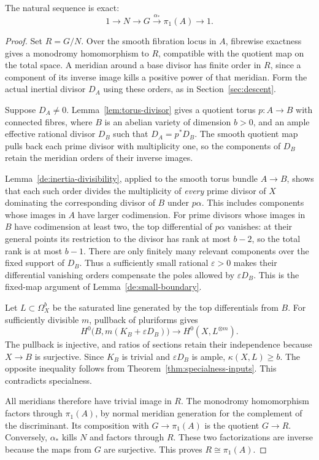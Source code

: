 \begin{lemma}\label{lem:albanese-exactness}
The natural sequence is exact:
\[
 1\longrightarrow N\longrightarrow G
 \xrightarrow{\alpha_*}\pi_1(A)\longrightarrow1.
\]
\end{lemma}
\begin{proof}
Set \(R=G/N\). Over the smooth fibration locus in \(A\), fibrewise
exactness gives a monodromy homomorphism to \(R\), compatible with the
quotient map on the total space. A meridian around a base divisor has
finite order in \(R\), since a component of its inverse image kills a
positive power of that meridian. Form the actual inertial divisor
\(D_A\) using these orders, as in Section~\ref{sec:descent}.

Suppose \(D_A\ne0\). Lemma~\ref{lem:torus-divisor} gives a quotient
torus \(p:A\to B\) with connected fibres, where \(B\) is an abelian
variety of dimension \(b>0\), and an ample effective rational divisor
\(D_B\) such that \(D_A=p^*D_B\). The smooth quotient map pulls back
each prime divisor with multiplicity one, so the components of \(D_B\)
retain the meridian orders of their inverse images.

Lemma~\ref{de:inertia-divisibility}, applied to the smooth torus
bundle \(A\to B\), shows that each such order divides the
multiplicity of \emph{every} prime divisor of \(X\) dominating the
corresponding divisor of \(B\) under \(p\alpha\). This includes
components whose images in \(A\) have larger codimension. For prime
divisors whose images in \(B\) have codimension at least two, the
top differential of \(p\alpha\) vanishes: at their general points
its restriction to the divisor has rank at most \(b-2\), so the
total rank is at most \(b-1\). There are only finitely many relevant
components over the fixed support of \(D_B\). Thus a sufficiently
small rational \(\varepsilon>0\) makes their differential vanishing
orders compensate the poles allowed by \(\varepsilon D_B\).
This is the fixed-map argument of Lemma~\ref{de:small-boundary}.

Let \(L\subset\Omega_X^b\) be the saturated line generated by
the top differentials from \(B\). For sufficiently divisible \(m\),
pullback of pluriforms gives
\[
 H^0\bigl(B,m(K_B+\varepsilon D_B)\bigr)
 \longrightarrow H^0(X,L^{\otimes m}).
\]
The pullback is injective, and ratios of sections retain their
independence because \(X\to B\) is surjective. Since \(K_B\) is
trivial and \(\varepsilon D_B\) is ample, \(\kappa(X,L)\ge b\).
The opposite inequality follows from
Theorem~\ref{thm:specialness-inputs}. This contradicts specialness.

All meridians therefore have trivial image in \(R\). The monodromy
homomorphism factors through \(\pi_1(A)\), by normal meridian
generation for the complement of the discriminant. Its composition
with \(G\to\pi_1(A)\) is the quotient \(G\to R\). Conversely,
\(\alpha_*\) kills \(N\) and factors through \(R\).
These two factorizations are inverse because the maps from \(G\)
are surjective. This proves \(R\cong\pi_1(A)\).
\end{proof}

